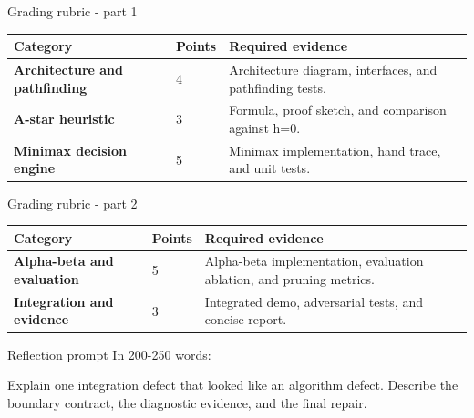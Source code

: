 \documentclass[aspectratio=169,11pt]{beamer}
\begin{document}
\begin{frame}{Grading rubric - part 1}
\scriptsize
\begin{tabularx}{\textwidth}{>{\bfseries}p{} p{} X}
\toprule
Category & Points & Required evidence \\
\midrule
Architecture and pathfinding & 4 & Architecture diagram, interfaces, and pathfinding tests. \\
A-star heuristic & 3 & Formula, proof sketch, and comparison against h=0. \\
Minimax decision engine & 5 & Minimax implementation, hand trace, and unit tests. \\
\bottomrule
\end{tabularx}
\end{frame}

\begin{frame}{Grading rubric - part 2}
\scriptsize
\begin{tabularx}{\textwidth}{>{\bfseries}p{} p{} X}
\toprule
Category & Points & Required evidence \\
\midrule
Alpha-beta and evaluation & 5 & Alpha-beta implementation, evaluation ablation, and pruning metrics. \\
Integration and evidence & 3 & Integrated demo, adversarial tests, and concise report. \\
\bottomrule
\end{tabularx}
\end{frame}

\begin{frame}{Reflection prompt}
In 200-250 words:

Explain one integration defect that looked like an algorithm defect. Describe the boundary contract, the diagnostic evidence, and the final repair.
\end{frame}
\end{document}
